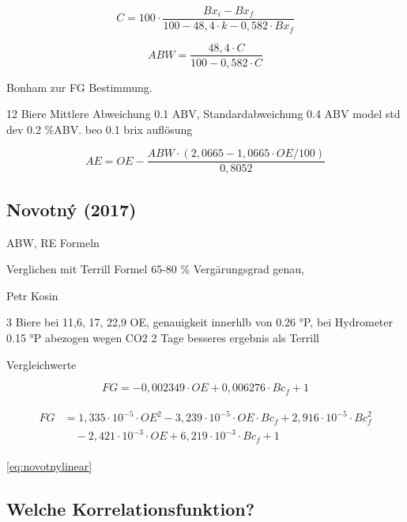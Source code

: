 \documentclass[a4paper,parskip=half]{scrartcl}
\newcommand{\bxi}{\mathit{Bx}_i}
\newcommand{\bxic}{\mathit{OE}}
\newcommand{\bxf}{\mathit{Bx}_f}
\newcommand{\bxfc}{\mathit{Bc}_f}
\newcommand{\fg}{\mathit{FG}}
\newcommand{\abw}{\mathit{ABW}}
\newcommand{\aex}{\mathit{AE}}
\begin{document}
\begin{equation}
C = 100 \cdot \frac{\bxi - \bxf}{100 - 48,4 \cdot k - 0,582 \cdot \bxf}
\end{equation}

\begin{equation}
\abw = \frac{48,4 \cdot C}{100 - 0,582 \cdot C}
\label{eq:gossett} 
\end{equation}

Bonham zur FG Bestimmung.

12 Biere Mittlere Abweichung 0.1 ABV, Standardabweichung 0.4 ABV
model std dev 0.2 \%ABV. beo 0.1 brix auflösung

\autocite{Gossett2012c}

\begin{equation}
\aex = \bxic - \frac{\abw \cdot (2,0665 - 1,0665 \cdot \bxic / 100)}{0,8052}
\end{equation}

\subsection*{Novotný (2017)}

ABW, RE Formeln

Verglichen mit Terrill Formel 65-80 \% Vergärungsgrad genau,

Petr Kosin

3 Biere bei 11,6, 17, 22,9 OE, genauigkeit innerhlb von
0.26 °P, bei Hydrometer 0.15 °P abezogen wegen CO2
2 Tage besseres ergebnis als Terrill
\autocite{Novotny2017}

Vergleichwerte
\autocite{Novotny2017a}


\begin{equation} 
\fg = -0,002349 \cdot \bxic + 0,006276 \cdot \bxfc + 1
\label{eq:novotnylinear} 
\end{equation}

\begin{align}
\begin{split}
\fg &= 1,335 \cdot 10^{-5} \cdot \bxic^2 - 3,239 \cdot 10^{-5} \cdot \bxic \cdot \bxfc + 2,916 \cdot 10^{-5} \cdot \bxfc^2 \\
& \quad - 2,421 \cdot 10^{-3} \cdot \bxic + 6,219 \cdot 10^{-3} \cdot \bxfc + 1
\end{split} \label{eq:novotnyquadratic} 
\end{align}

\autoref{eq:novotnylinear}

\subsection*{Welche Korrelationsfunktion?}
\end{document}
